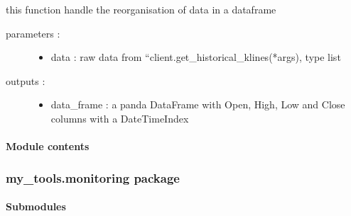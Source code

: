 \documentclass[letterpaper,10pt,english]{sphinxmanual}
\begin{document}
\begin{fulllineitems}
\label{\detokenize{my_tools.cryptools:my_tools.cryptools.visualisation.organnise_data}}
\sphinxAtStartPar
this function handle the re\sphinxhyphen{}organisation of data in a dataframe
\begin{description}
\item[{parameters :}] \leavevmode\begin{itemize}
\item {} 
\sphinxAtStartPar
data : raw data from “client.get\_historical\_klines(*args), type list

\end{itemize}

\item[{outputs :}] \leavevmode\begin{itemize}
\item {} 
\sphinxAtStartPar
data\_frame : a panda DataFrame with Open, High, Low and Close columns with a DateTimeIndex

\end{itemize}

\end{description}

\end{fulllineitems}



\paragraph{Module contents}
\label{\detokenize{my_tools.cryptools:module-my_tools.cryptools}}\label{\detokenize{my_tools.cryptools:module-contents}}

\subsubsection{my\_tools.monitoring package}
\label{\detokenize{my_tools.monitoring:my-tools-monitoring-package}}\label{\detokenize{my_tools.monitoring::doc}}

\paragraph{Submodules}
\label{\detokenize{my_tools.monitoring:submodules}}
\end{document}
